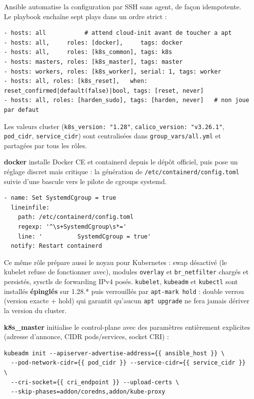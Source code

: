 \documentclass[12pt,a4paper,twoside,openright]{report}
\begin{document}
Ansible automatise la configuration par SSH sans agent, de façon idempotente. Le
playbook enchaîne sept plays dans un ordre strict :

\begin{lstlisting}[caption={playbook.yml : structure globale}]
- hosts: all           # attend cloud-init avant de toucher a apt
- hosts: all,     roles: [docker],     tags: docker
- hosts: all,     roles: [k8s_common], tags: k8s
- hosts: masters, roles: [k8s_master], tags: master
- hosts: workers, roles: [k8s_worker], serial: 1, tags: worker
- hosts: all, roles: [k8s_reset],   when: reset_confirmed|default(false)|bool, tags: [reset, never]
- hosts: all, roles: [harden_sudo], tags: [harden, never]   # non joue par defaut
\end{lstlisting}

Les valeurs cluster (\texttt{k8s\_version: "1.28"}, \texttt{calico\_version:
"v3.26.1"}, \texttt{pod\_cidr}, \texttt{service\_cidr}) sont centralisées dans
\texttt{group\_vars/all.yml} et partagées par tous les rôles.

\textbf{docker} installe Docker CE et containerd depuis le dépôt officiel, puis pose
un réglage discret mais critique : la génération de \texttt{/etc/containerd/config.toml}
suivie d'une bascule vers le pilote de cgroups systemd.

\begin{lstlisting}[caption={Bascule cruciale : pilote cgroup systemd pour containerd}]
- name: Set SystemdCgroup = true
  lineinfile:
    path: /etc/containerd/config.toml
    regexp: '^\s+SystemdCgroup\s*='
    line: '          SystemdCgroup = true'
  notify: Restart containerd
\end{lstlisting}

Ce même rôle prépare aussi le noyau pour Kubernetes : swap désactivé (le kubelet
refuse de fonctionner avec), modules \texttt{overlay} et \texttt{br\_netfilter}
chargés et persistés, sysctls de forwarding IPv4 posés. \texttt{kubelet},
\texttt{kubeadm} et \texttt{kubectl} sont installés \textbf{épinglés} sur 1.28.* puis
verrouillés par \texttt{apt-mark hold} : double verrou (version exacte + hold) qui
garantit qu'aucun \texttt{apt upgrade} ne fera jamais dériver la version du cluster.

\textbf{k8s\_master} initialise le control-plane avec des paramètres entièrement
explicites (adresse d'annonce, CIDR pods/services, socket CRI) :

\begin{lstlisting}[caption={kubeadm init : addons différés pour éviter les CrashLoop initiaux}]
kubeadm init --apiserver-advertise-address={{ ansible_host }} \
  --pod-network-cidr={{ pod_cidr }} --service-cidr={{ service_cidr }} \
  --cri-socket={{ cri_endpoint }} --upload-certs \
  --skip-phases=addon/coredns,addon/kube-proxy
\end{lstlisting}
\end{document}
